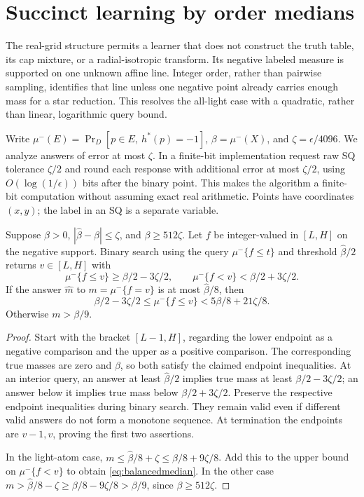 \section{Succinct learning by order medians}\label{sec:fast}
The real-grid structure permits a learner that does not construct the truth table, its cap mixture, or a radial-isotropic transform. Its negative labeled measure is supported on one unknown affine line. Integer order, rather than pairwise sampling, identifies that line unless one negative point already carries enough mass for a star reduction. This resolves the all-light case with a quadratic, rather than linear, logarithmic query bound.

Write $\mu^-(E)=\Pr_D[p\in E,\ h^*(p)=-1]$, $\beta=\mu^-(X)$, and $\zeta=\epsilon/4096$. We analyze answers of error at most $\zeta$. In a finite-bit implementation request raw SQ tolerance $\zeta/2$ and round each response with additional error at most $\zeta/2$, using $O(\log(1/\epsilon))$ bits after the binary point. This makes the algorithm a finite-bit computation without assuming exact real arithmetic. Points have coordinates $(x,y)$; the label in an SQ is a separate variable.

\begin{samepage}
\begin{lemma}\label{lem:median}
Suppose $\beta>0$, $|\widehat\beta-\beta|\le\zeta$, and $\beta\ge512\zeta$. Let $f$ be integer-valued in $[L,H]$ on the negative support. Binary search using the query $\mu^-\{f\le t\}$ and threshold $\widehat\beta/2$ returns $v\in[L,H]$ with
\[
 \mu^-\{f\le v\}\ge\beta/2-3\zeta/2,
 \qquad
 \mu^-\{f<v\}<\beta/2+3\zeta/2.
\]
If the answer $\widehat m$ to $m=\mu^-\{f=v\}$ is at most $\widehat\beta/8$, then
\begin{equation}\label{eq:balancedmedian}
 \beta/2-3\zeta/2\le\mu^-\{f\le v\}
 <5\beta/8+21\zeta/8.
\end{equation}
Otherwise $m>\beta/9$.
\end{lemma}
\end{samepage}
\begin{proof}
Start with the bracket $[L-1,H]$, regarding the lower endpoint as a negative comparison and the upper as a positive comparison. The corresponding true masses are zero and $\beta$, so both satisfy the claimed endpoint inequalities. At an interior query, an answer at least $\widehat\beta/2$ implies true mass at least $\beta/2-3\zeta/2$; an answer below it implies true mass below $\beta/2+3\zeta/2$. Preserve the respective endpoint inequalities during binary search. They remain valid even if different valid answers do not form a monotone sequence. At termination the endpoints are $v-1,v$, proving the first two assertions.

In the light-atom case, $m\le\widehat\beta/8+\zeta\le\beta/8+9\zeta/8$. Add this to the upper bound on $\mu^-\{f<v\}$ to obtain \eqref{eq:balancedmedian}. In the other case $m>\widehat\beta/8-\zeta\ge\beta/8-9\zeta/8>\beta/9$, since $\beta\ge512\zeta$.
\end{proof}

